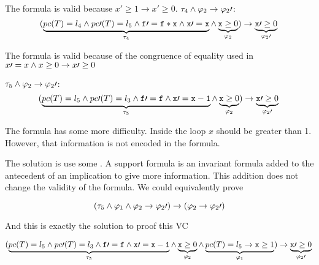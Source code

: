 	The formula is valid because $x\prime \geq 1 \to x\prime \geq 0$.
	\; $\tau_4 \wedge \varphi_2 \to \varphi_2\prime $:	
	\begin{equation*}
		(
			\underbrace{pc(T) = l_4 \wedge pc\prime (T) = l_5 \wedge \mathtt{f}\prime  = \mathtt{f*x} \wedge \mathtt{x\prime =x}}_{\tau_4} \wedge \underbrace{\mathtt{x} \geq 0}_{\varphi_2}
		) 
			\to \underbrace{\mathtt{x}\prime  \geq 0}_{\varphi_2\prime }\\\\
	\end{equation*}


	The formula is valid because of the congruence of equality used in  $x\prime =x \wedge x\geq 0 \to x\prime \geq 0$ 

	\; $\tau_5 \wedge \varphi_2 \to \varphi_2\prime $:	
	\begin{equation*}
		(
			\underbrace{pc(T) = l_5 \wedge pc\prime (T) = l_3 \wedge \mathtt{f\prime =f} \wedge \mathtt{x\prime =x-1}}_{\tau_5} \wedge \underbrace{\mathtt{x} \geq 0}_{\varphi_2}
		) 
			\to \underbrace{\mathtt{x}\prime  \geq 0}_{\varphi_2\prime }\\\\
	\end{equation*}


	The formula has some more difficulty. 
	Inside the loop $x$ should be greater than 1.
	However, that information is not encoded in the formula.
	
	The solution is use some .
	A support formula is an invariant formula added to the antecedent of an implication to give more information. 
	This addition does not change the validity of the formula.
	We could equivalently prove

	\[
		(\tau_5 \wedge \varphi_1 \wedge \varphi_2 \to \varphi_2\prime ) \rightarrow (\varphi_2\to\varphi_2\prime )
	\]

	And this is exactly the solution to proof this \gls{VC}

	

	\begin{equation*}
		(
			\underbrace{pc(T) = l_5 \wedge pc\prime (T) = l_3 \wedge \mathtt{f\prime =f} \wedge \mathtt{x\prime =x-1}}_{\tau_5} \wedge \underbrace{\mathtt{x} \geq 0}_{\varphi_2} \wedge \underbrace{pc(T) = l_5 \to \mathtt{x} \geq 1}_{\varphi_1}
		) 
			\to \underbrace{\mathtt{x}\prime  \geq 0}_{\varphi_2\prime }\\\\
	\end{equation*}


